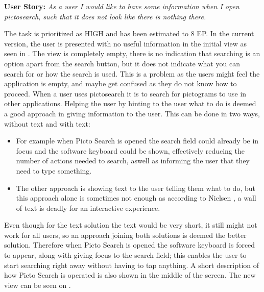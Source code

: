 \textbf{User Story:} \textit{As a user I would like to have some information when I open pictosearch, such that it does not look like there is nothing there.} \newline

The task is prioritized as HIGH and has been estimated to 8 EP.
In the current version, the user is presented with no useful information in the initial view as seen in . 
The view is completely empty, there is no indication that searching is an option apart from the search button, but it does not indicate what you can search for or how the search is used.
This is a problem as the users might feel the application is empty, and maybe get confused as they do not know how to proceed.
When a user uses pictosearch it is to search for pictograms to use in other applications.
Helping the user by hinting to the user what to do is deemed a good approach in giving information to the user.
This can be done in two ways, without text and with text:
\begin{itemize}
    \item For example when Picto Search is opened the search field could already be in focus and the software keyboard could be shown, effectively reducing the number of actions needed to search, aswell as informing the user that they need to type something.
    \item The other approach is showing text to the user telling them what to do, but this approach alone is sometimes not enough as according to Nielsen \cite{nielsen2003usability}, a wall of text is deadly for an interactive experience.
\end{itemize}

Even though for the text solution the text would be very short, it still might not work for all users, so an approach joining both solutions is deemed the better solution.
Therefore when Picto Search is opened the software keyboard is forced to appear, along with giving focus to the search field; this enables the user to start searching right away without having to tap anything.
A short description of how Picto Search is operated is also shown in the middle of the screen.
The new view can be seen on .